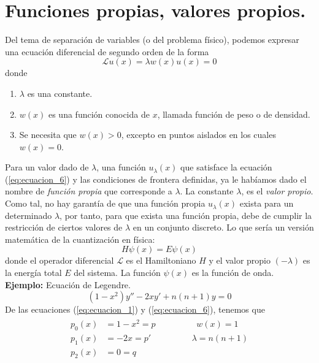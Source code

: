\section{Funciones propias, valores propios.}
Del tema de separación de variables (o del problema físico), podemos expresar una ecuación diferencial de segundo orden de la forma
\begin{equation}
\mathscr{L} u(x) =  \lambda w(x) u(x) = 0
\label{eq:ecuacion_6}
\end{equation}
donde
\begin{enumerate}
\item $\lambda$ es una constante.
\item $w(x)$ es una función conocida de $x$, llamada función de peso o de densidad.
\item Se necesita que $w(x)>0$, excepto en puntos aislados en los cuales $w(x)=0$.
\end{enumerate}
Para un valor dado de $\lambda$, una función $u_{\lambda}(x)$ que satisface la ecuación (\ref{eq:ecuacion_6}) y las condiciones de frontera definidas, ya le habíamos dado el nombre de \emph{función propia} que corresponde a $\lambda$. La constante $\lambda$, es el \emph{valor propio}.
\\
Como tal, no hay garantía de que una función propia $u_{\lambda}(x)$ exista para un determinado $\lambda$, por tanto, para que exista una función propia, debe de cumplir la restricción de ciertos valores de $\lambda$ en un conjunto discreto. Lo que sería un versión matemática de la cuantización en física:
\[ H \psi (x) =  E \psi (x) \]
donde el operador diferencial $\mathscr{L}$ es el Hamiltoniano $H$ y el valor propio $(-\lambda)$ es la energía total $E$ del sistema. La función $\psi (x)$ es la función de onda.
\\
\textbf{Ejemplo:} Ecuación de Legendre.
\begin{equation}
(1-x^{2}) y'' - 2xy' + n(n+1) y = 0 \label{eq:ecuacion_7}
\end{equation}
De las ecuaciones (\ref{eq:ecuacion_1}) y (\ref{eq:ecuacion_6}), tenemos que
\begin{eqnarray}
\begin{aligned}
p_{0}(x) &= 1 - x^{2} = p \hspace{2cm} w(x) =  1 \\
p_{1}(x) &= -2x = p' \hspace{2cm} \lambda = n(n+1) \\
p_{2}(x) &= 0 = q
\end{aligned}
\end{eqnarray}
